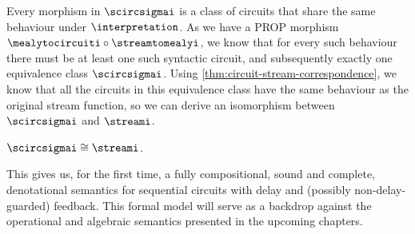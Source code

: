 Every morphism in \(\scircsigmai\) is a class of circuits that share the
same behaviour under \(\interpretation\).
As we have a PROP morphism \(\mealytocircuiti \circ \streamtomealyi\), we know
that for every such behaviour there must be at least one such syntactic circuit,
and subsequently exactly one equivalence class \(\scircsigmai\).
Using \cref{thm:circuit-stream-correspondence}, we know that all the circuits in
this equivalence class have the same behaviour as the original stream function,
so we can derive an isomorphism between \(\scircsigmai\) and
\(\streami\).

\begin{corollary}
    \(\scircsigmai \cong \streami\).
\end{corollary}

This gives us, for the first time, a fully compositional, sound and complete,
denotational semantics for sequential circuits with delay and (possibly
non-delay-guarded) feedback.
This formal model will serve as a backdrop against the operational and
algebraic semantics presented in the upcoming chapters.